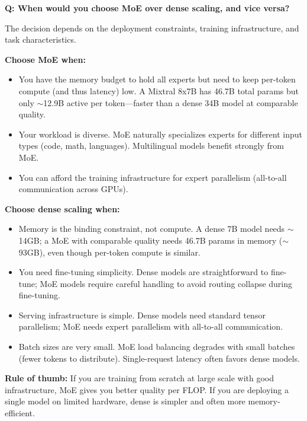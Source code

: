 \begin{interviewq}
\textbf{Q: When would you choose MoE over dense scaling, and vice versa?}

 \quad {} \quad \badgefreq{\freqmed}

\stronganswer

The decision depends on the deployment constraints, training infrastructure, and task characteristics.

\textbf{Choose MoE when:}
\begin{itemize}
    \item You have the memory budget to hold all experts but need to keep per-token compute (and thus latency) low. A Mixtral 8x7B has 46.7B total params but only $\sim$12.9B active per token---faster than a dense 34B model at comparable quality.
    \item Your workload is diverse. MoE naturally specializes experts for different input types (code, math, languages). Multilingual models benefit strongly from MoE.
    \item You can afford the training infrastructure for expert parallelism (all-to-all communication across GPUs).
\end{itemize}

\textbf{Choose dense scaling when:}
\begin{itemize}
    \item Memory is the binding constraint, not compute. A dense 7B model needs $\sim$14GB; a MoE with comparable quality needs 46.7B params in memory ($\sim$93GB), even though per-token compute is similar.
    \item You need fine-tuning simplicity. Dense models are straightforward to fine-tune; MoE models require careful handling to avoid routing collapse during fine-tuning.
    \item Serving infrastructure is simple. Dense models need standard tensor parallelism; MoE needs expert parallelism with all-to-all communication.
    \item Batch sizes are very small. MoE load balancing degrades with small batches (fewer tokens to distribute). Single-request latency often favors dense models.
\end{itemize}

\textbf{Rule of thumb:} If you are training from scratch at large scale with good infrastructure, MoE gives you better quality per FLOP. If you are deploying a single model on limited hardware, dense is simpler and often more memory-efficient.


\end{interviewq}
